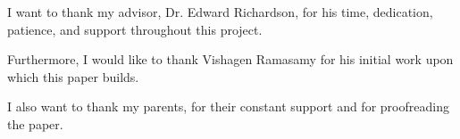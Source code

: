 
I want to thank my advisor, Dr. Edward Richardson, for his time, dedication, patience, and support throughout this project.
 
 Furthermore, I would like to thank Vishagen Ramasamy for his initial work upon which this paper builds.
 
 I also want to thank my parents, for their constant support and for proofreading the paper. 